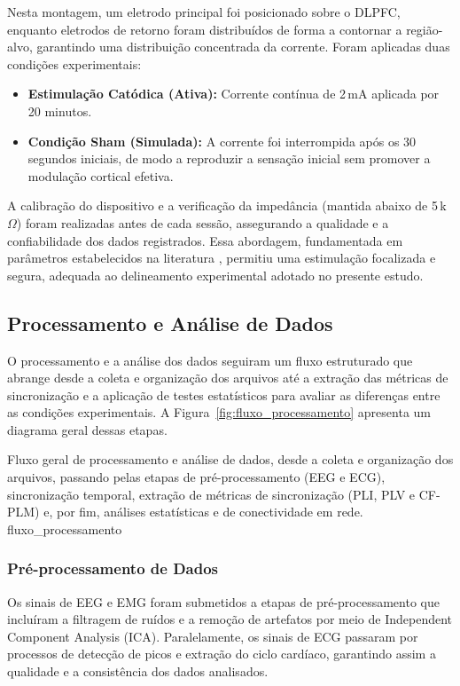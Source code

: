Nesta montagem, um eletrodo principal foi posicionado sobre o DLPFC, enquanto eletrodos de retorno foram distribuídos de forma a contornar a região-alvo, garantindo uma distribuição concentrada da corrente. Foram aplicadas duas condições experimentais:
\begin{itemize}
    \item \textbf{Estimulação Catódica (Ativa):} Corrente contínua de 2\,mA aplicada por 20 minutos.
    \item \textbf{Condição Sham (Simulada):} A corrente foi interrompida após os 30\,segundos iniciais, de modo a reproduzir a sensação inicial sem promover a modulação cortical efetiva.
\end{itemize}

A calibração do dispositivo e a verificação da impedância (mantida abaixo de 5\,k$\Omega$) foram realizadas antes de cada sessão, assegurando a qualidade e a confiabilidade dos dados registrados. Essa abordagem, fundamentada em parâmetros estabelecidos na literatura \cite{datta2008transcranial, stagg2011physiological}, permitiu uma estimulação focalizada e segura, adequada ao delineamento experimental adotado no presente estudo.


\subsection{Processamento e Análise de Dados}

O processamento e a análise dos dados seguiram um fluxo estruturado que abrange desde a coleta e organização dos arquivos até a extração das métricas de sincronização e a aplicação de testes estatísticos para avaliar as diferenças entre as condições experimentais. A Figura~\ref{fig:fluxo_processamento} apresenta um diagrama geral dessas etapas.

{Fluxo geral de processamento e análise de dados, desde a coleta e organização dos arquivos, passando pelas etapas de pré-processamento (EEG e ECG), sincronização temporal, extração de métricas de sincronização (PLI, PLV e CF-PLM) e, por fim, análises estatísticas e de conectividade em rede.}
{fluxo_processamento}


\subsubsection{Pré-processamento de Dados}
Os sinais de EEG e EMG foram submetidos a etapas de pré-processamento que incluíram a filtragem de ruídos e a remoção de artefatos por meio de Independent Component Analysis (ICA). Paralelamente, os sinais de ECG passaram por processos de detecção de picos e extração do ciclo cardíaco, garantindo assim a qualidade e a consistência dos dados analisados.

